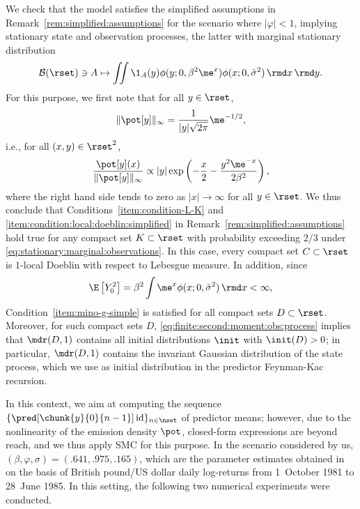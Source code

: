 We check that the model satisfies the simplified assumptions in Remark~\ref{rem:simplified:assumptions} for the scenario where $|\varphi| < 1$, implying stationary state and observation processes, the latter with marginal stationary distribution 
\begin{equation} \label{eq:stationary:marginal:observations}
	\mathcal{B}(\rset) \ni A \mapsto \iint \1_A(y) \phi(y ; 0, \beta^2 \me^x) \phi(x ; 0, \tilde{\sigma}^2) \, \rmd x \, \rmd y. 
\end{equation}
For this purpose, we first note that for all $y \in \rset$,
$$
	\| \pot[y] \|_\infty = \frac{1}{|y| \sqrt{2 \pi}} \me^{-1/2}, 
$$
i.e., for all $(x, y) \in \rset^2$, 
\begin{equation*}
	\frac{\pot[y](x)}{\| \pot[y] \|_\infty} \propto |y| \exp \left( - \frac{x}{2} - \frac{y^2 \me^{- x}}{2 \beta^2} \right), 
\end{equation*}
where the right hand side tends to zero as $|x| \rightarrow \infty$ for all $y \in \rset$. We thus conclude that Conditions~\eqref{item:condition-L-K} and \eqref{item:condition:local:doeblin:simplified} in Remark~\ref{rem:simplified:assumptions} hold true for any compact set $K \subset \rset$ with probability exceeding $2/3$ under \eqref{eq:stationary:marginal:observations}. In this case, every compact set $C \subset \rset$ is $1$-local Doeblin with respect to Lebesgue measure. In addition, since 
\begin{equation} \label{eq:finite:second:moment:obs:process}
	\E \left[Y_0^2 \right] = \beta^2 \int \me^x \phi(x ; 0, \tilde{\sigma}^2) \, \rmd x < \infty, 
\end{equation}
Condition~\eqref{item:mino-g-simple} is satisfied for all compact sets $D \subset \rset$. Moreover, for such compact sets $D$, \eqref{eq:finite:second:moment:obs:process} implies that $\mdr(D, 1)$ contains all initial distributions $\init$ with $\init(D) > 0$; in particular,  $\mdr(D, 1)$ contains the invariant Gaussian distribution of the state process, which we use as initial distribution in the predictor Feynman-Kac recursion. 

In this context, we aim at computing the sequence $\{ \pred[\chunk{y}{0}{n - 1}] \operatorname{id} \}_{n \in \nset}$ of predictor means; however, due to the nonlinearity of the emission density $\pot$, closed-form expressions are beyond reach, and we thus apply SMC for this purpose. In the scenario considered by us, $(\beta, \varphi, \sigma) = (.641, .975, .165)$, which are the parameter estimates obtained in \cite[Example~11.1.1.2]{cappe:moulines:ryden:2005} on the basis of British pound/US dollar daily log-returns from 1~October 1981 to 28~June 1985. In this setting, the following two numerical experiments were conducted.  

